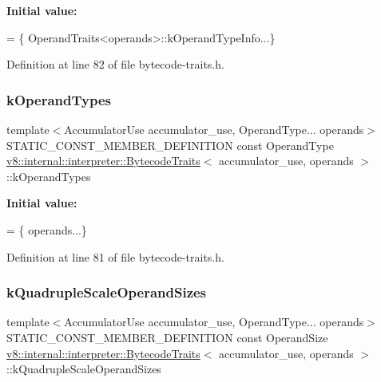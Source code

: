 {\bfseries Initial value\+:}
\begin{DoxyCode}
= \{
        OperandTraits<operands>::kOperandTypeInfo...\}
\end{DoxyCode}


Definition at line 82 of file bytecode-\/traits.\+h.

\mbox{\label{structv8_1_1internal_1_1interpreter_1_1BytecodeTraits_a18a7c2ad72489ff9834b0459793b7a56}} 
\subsubsection{\texorpdfstring{k\+Operand\+Types}{kOperandTypes}}
{\footnotesize\ttfamily template$<$Accumulator\+Use accumulator\+\_\+use, Operand\+Type... operands$>$ \\
S\+T\+A\+T\+I\+C\+\_\+\+C\+O\+N\+S\+T\+\_\+\+M\+E\+M\+B\+E\+R\+\_\+\+D\+E\+F\+I\+N\+I\+T\+I\+ON const Operand\+Type \mbox{\hyperlink{structv8_1_1internal_1_1interpreter_1_1BytecodeTraits}{v8\+::internal\+::interpreter\+::\+Bytecode\+Traits}}$<$ accumulator\+\_\+use, operands $>$\+::k\+Operand\+Types\hspace{0.3cm}{\ttfamily [static]}}

{\bfseries Initial value\+:}
\begin{DoxyCode}
= \{
        operands...\}
\end{DoxyCode}


Definition at line 81 of file bytecode-\/traits.\+h.

\mbox{\label{structv8_1_1internal_1_1interpreter_1_1BytecodeTraits_a099c18eefbd65eb855a2e254731d020c}} 
\subsubsection{\texorpdfstring{k\+Quadruple\+Scale\+Operand\+Sizes}{kQuadrupleScaleOperandSizes}}
{\footnotesize\ttfamily template$<$Accumulator\+Use accumulator\+\_\+use, Operand\+Type... operands$>$ \\
S\+T\+A\+T\+I\+C\+\_\+\+C\+O\+N\+S\+T\+\_\+\+M\+E\+M\+B\+E\+R\+\_\+\+D\+E\+F\+I\+N\+I\+T\+I\+ON const Operand\+Size \mbox{\hyperlink{structv8_1_1internal_1_1interpreter_1_1BytecodeTraits}{v8\+::internal\+::interpreter\+::\+Bytecode\+Traits}}$<$ accumulator\+\_\+use, operands $>$\+::k\+Quadruple\+Scale\+Operand\+Sizes\hspace{0.3cm}{\ttfamily [static]}}

